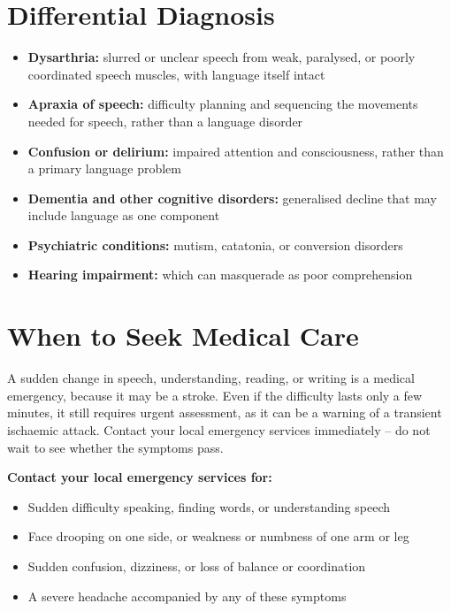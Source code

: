 \section*{Differential Diagnosis}
\begin{itemize}
    \item \textbf{Dysarthria:} slurred or unclear speech from weak, paralysed, or poorly coordinated speech muscles, with language itself intact
    \item \textbf{Apraxia of speech:} difficulty planning and sequencing the movements needed for speech, rather than a language disorder
    \item \textbf{Confusion or delirium:} impaired attention and consciousness, rather than a primary language problem
    \item \textbf{Dementia and other cognitive disorders:} generalised decline that may include language as one component
    \item \textbf{Psychiatric conditions:} mutism, catatonia, or conversion disorders
    \item \textbf{Hearing impairment:} which can masquerade as poor comprehension
\end{itemize}

\section*{When to Seek Medical Care}
A sudden change in speech, understanding, reading, or writing is a medical emergency, because it may be a stroke. Even if the difficulty lasts only a few minutes, it still requires urgent assessment, as it can be a warning of a transient ischaemic attack. Contact your local emergency services immediately -- do not wait to see whether the symptoms pass.

\textbf{Contact your local emergency services for:}
\begin{itemize}
    \item Sudden difficulty speaking, finding words, or understanding speech
    \item Face drooping on one side, or weakness or numbness of one arm or leg
    \item Sudden confusion, dizziness, or loss of balance or coordination
    \item A severe headache accompanied by any of these symptoms
\end{itemize}

